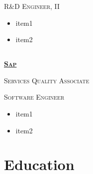 \documentclass{article}
\begin{document}
{\raggedright{\textsc{R\&D Engineer, II}}} \hfill {}

\begin{itemize}[noitemsep,nolistsep]
	\item item1
	\item item2
\end{itemize}

\subsection[Sap]{}
{\raggedright{\textsc{\textbf{\href{https://www.sap.com/index.html}{Sap}}}}} \hfill {}

{\raggedright{\textsc{Services Quality Associate}}} \hfill {}

{\raggedright{\textsc{Software Engineer}}} \hfill {}

\begin{itemize}[noitemsep,nolistsep]
	\item item1
	\item item2
\end{itemize}

\section{Education}
\end{document}
